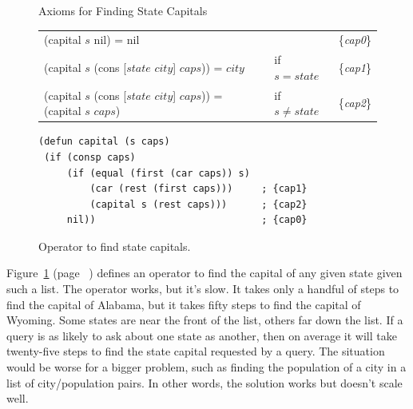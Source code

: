 \begin{figure}
\begin{center}
Axioms for Finding State Capitals
\begin{spacing}{0.9}
\begin{tabular}{lll}
\hline
(\textsf{capital} $s$ nil) = nil                               &             & \{\emph{cap0}\} \\
(\textsf{capital} $s$ (\textsf{cons} [$state$ $city$] $caps$)) = $city$ &if $s=state$ & \{\emph{cap1}\} \\
(\textsf{capital} $s$ (\textsf{cons} [$state$ $city$] $caps$)) = (\textsf{capital} $s$ $caps$) & if $s \neq state$ & \{\emph{cap2}\} \\
\end{tabular}
\end{spacing}
\begin{code}
\begin{verbatim}
(defun capital (s caps)
 (if (consp caps)
     (if (equal (first (car caps)) s)
         (car (rest (first caps)))     ; {cap1}
         (capital s (rest caps)))      ; {cap2}
     nil))                             ; {cap0}
\end{verbatim}
\end{code}
\caption{Operator to find state capitals.}
\label{fig:state-capital-operator}
\end{center}
\end{figure}

Figure~\ref{fig:state-capital-operator} (page ~\pageref{fig:state-capital-operator})
defines an operator to find the
capital of any given state given such a list.
The operator works, but it's slow.
It takes only a handful of steps to find the capital of Alabama,
but it takes fifty steps to find the capital of Wyoming.
Some states are near the front of the list,
others far down the list.
If a query is as likely to ask about
one state as another,
then on average it will take twenty-five steps to find
the state capital requested by a query.
The situation would be worse for a bigger problem,
such as finding the population of a city in a list of city/population pairs.
In other words, the solution works but doesn't scale well.

